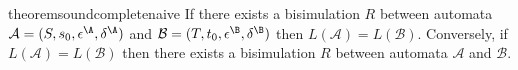 \begin{restatable}{theorem}{soundcompletenaive}
If there exists a bisimulation $R$ between \NetKAT automata
$\mathcal{A} = (S, s_0, \epsilon^\A, \delta^\A)$ and $\mathcal{B} = (T, t_0,
\epsilon^\B, \delta^\B)$ then $L(\mathcal{A}) = L(\mathcal{B})$.  Conversely, if
$L(\mathcal{A}) = L(\mathcal{B})$ then there exists a bisimulation $R$
between \NetKAT automata $\mathcal{A}$ and $\mathcal B$.
\end{restatable}